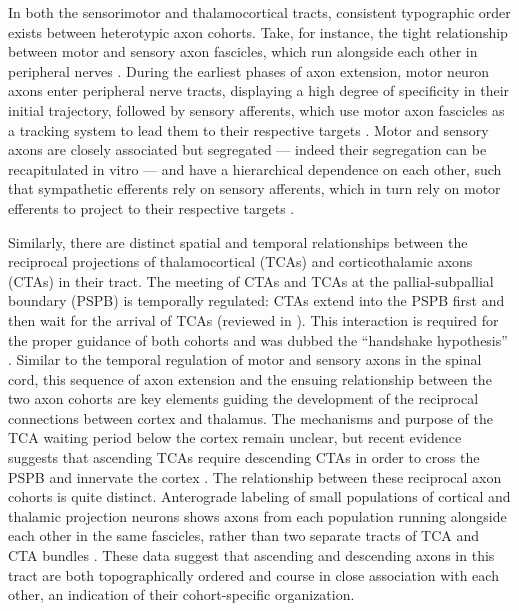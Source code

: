 In both the sensorimotor and thalamocortical tracts, consistent typographic order exists between heterotypic axon cohorts.
Take, for instance, the tight relationship between motor and sensory axon fascicles, which run alongside each other in peripheral nerves \cite{honig1998spatial}. 
During the earliest phases of axon extension, motor neuron axons enter peripheral nerve tracts, displaying a high degree of specificity in their initial trajectory, followed by sensory afferents, which use motor axon fascicles as a tracking system to lead them to their respective targets \cite{landmesser1986altered,huettl2011npn,wang2013axons,wang2014conserved}.
Motor and sensory axons are closely associated but segregated --- indeed their segregation can be recapitulated in vitro \cite{gallarda2008segregation} --- and have a hierarchical dependence on each other, such that sympathetic efferents rely on sensory afferents, which in turn rely on motor efferents to project to their respective targets \cite{wang2014conserved}.

Similarly, there are distinct spatial and temporal relationships between the reciprocal projections of thalamocortical (TCAs) and corticothalamic axons (CTAs) in their tract.
The meeting of CTAs and TCAs at the pallial-subpallial boundary (PSPB) is temporally regulated: CTAs extend into the PSPB first and then wait for the arrival of TCAs (reviewed in ). 
This interaction is required for the proper guidance of both cohorts and was dubbed the ``handshake hypothesis'' \cite{molnar1995thalamic}.
Similar to the temporal regulation of motor and sensory axons in the spinal cord, this sequence of axon extension and the ensuing relationship between the two axon cohorts are key elements guiding the development of the reciprocal connections between cortex and thalamus. 
The mechanisms and purpose of the TCA waiting period below the cortex remain unclear, but recent evidence suggests that ascending TCAs require descending CTAs in order to cross the PSPB and innervate the cortex \cite{chen2012evidence}.
The relationship between these reciprocal axon cohorts is quite distinct.
Anterograde labeling of small populations of cortical and thalamic projection neurons shows axons from each population running alongside each other in the same fascicles, rather than two separate tracts of TCA and CTA bundles \cite{molnar1998mechanisms}. 
These data suggest that ascending and descending axons in this tract are both topographically ordered and course in close association with each other, an indication of their cohort-specific organization. 
